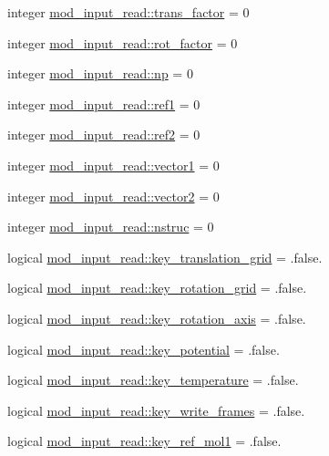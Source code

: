 \begin{DoxyCompactItemize}
integer \hyperlink{namespacemod__input__read_a0c42ae57c5b1cbe6dbbb2cf1691525ce}{mod\+\_\+input\+\_\+read\+::trans\+\_\+factor} = 0
\item 
integer \hyperlink{namespacemod__input__read_a6fde65123947b8b3eaf114c2d96caaad}{mod\+\_\+input\+\_\+read\+::rot\+\_\+factor} = 0
\item 
integer \hyperlink{namespacemod__input__read_a4f57e5d94eb06921bf584303b54c88f4}{mod\+\_\+input\+\_\+read\+::np} = 0
\item 
integer \hyperlink{namespacemod__input__read_a1fffe01a8c7b8966aa213553649f0cce}{mod\+\_\+input\+\_\+read\+::ref1} = 0
\item 
integer \hyperlink{namespacemod__input__read_afe9324d2c3dd5b8f8d1afb900599f1e3}{mod\+\_\+input\+\_\+read\+::ref2} = 0
\item 
integer \hyperlink{namespacemod__input__read_a9b7f8f60997dd0fb2edfa04aef14fa29}{mod\+\_\+input\+\_\+read\+::vector1} = 0
\item 
integer \hyperlink{namespacemod__input__read_afe62d1fbe309ed810c66abd20164a320}{mod\+\_\+input\+\_\+read\+::vector2} = 0
\item 
integer \hyperlink{namespacemod__input__read_a176a374fb1f2efbff8fdca2a950c77b0}{mod\+\_\+input\+\_\+read\+::nstruc} = 0
\item 
logical \hyperlink{namespacemod__input__read_a668e8b052b58c62bdcb1fde214459cb1}{mod\+\_\+input\+\_\+read\+::key\+\_\+translation\+\_\+grid} = .false.
\item 
logical \hyperlink{namespacemod__input__read_a3a5a0477db778e79dd96be267f9ebde5}{mod\+\_\+input\+\_\+read\+::key\+\_\+rotation\+\_\+grid} = .false.
\item 
logical \hyperlink{namespacemod__input__read_a72d79af87249c49e917e16ed9978d242}{mod\+\_\+input\+\_\+read\+::key\+\_\+rotation\+\_\+axis} = .false.
\item 
logical \hyperlink{namespacemod__input__read_a9227a15f259c9085a4a610eedbcf070c}{mod\+\_\+input\+\_\+read\+::key\+\_\+potential} = .false.
\item 
logical \hyperlink{namespacemod__input__read_a119a4d5f6c8db10062bf46a95dc5ddfa}{mod\+\_\+input\+\_\+read\+::key\+\_\+temperature} = .false.
\item 
logical \hyperlink{namespacemod__input__read_a54f4396af49b6cf2c5a16f000fa7369b}{mod\+\_\+input\+\_\+read\+::key\+\_\+write\+\_\+frames} = .false.
\item 
logical \hyperlink{namespacemod__input__read_a58058a29fc5300521bfe3658ba0444e1}{mod\+\_\+input\+\_\+read\+::key\+\_\+ref\+\_\+mol1} = .false.

\end{DoxyCompactItemize}
